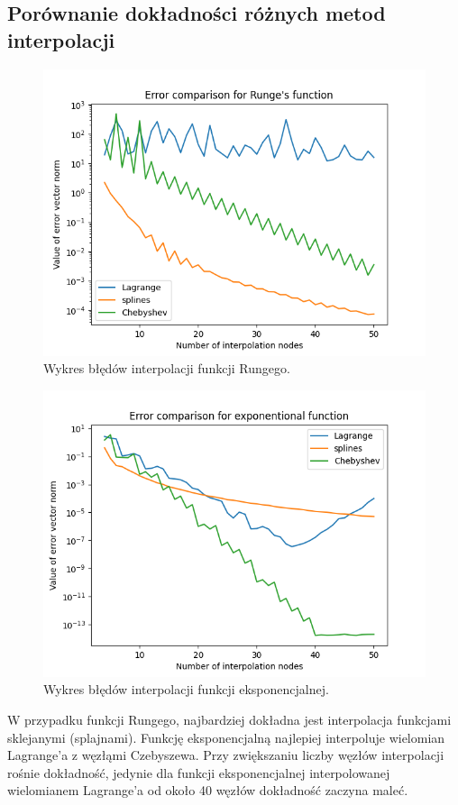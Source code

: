 \documentclass[11pt]{scrartcl}
\begin{document}
    \subsection{Porównanie dokładności różnych metod interpolacji}
    \begin{figure}[H]
        \centering
        \includegraphics[width=0.75\linewidth]{interpolation2.png}
        \caption{Wykres błędów interpolacji funkcji Rungego.}
    \end{figure}
    \begin{figure}[H]
        \centering
        \includegraphics[width=0.75\linewidth]{interpolation3.png}
        \caption{Wykres błędów interpolacji funkcji eksponencjalnej.}
    \end{figure}

    W przypadku funkcji Rungego, najbardziej dokładna jest
    interpolacja funkcjami sklejanymi (splajnami). Funkcję
    eksponencjalną najlepiej interpoluje wielomian Lagrange'a
    z węzłąmi Czebyszewa. Przy zwiększaniu liczby węzłów interpolacji
    rośnie dokładność, jedynie dla funkcji eksponencjalnej
    interpolowanej wielomianem Lagrange'a od około 40 węzłów
    dokładność zaczyna maleć.
\end{document}
